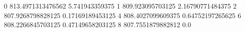 0 813.4971313476562 5.741943359375
1 809.923095703125 2.16790771484375
2 807.9268798828125 0.17169189453125
4 808.4027099609375 0.64752197265625
6 808.2266845703125 0.47149658203125
8 807.7551879882812 0.0
